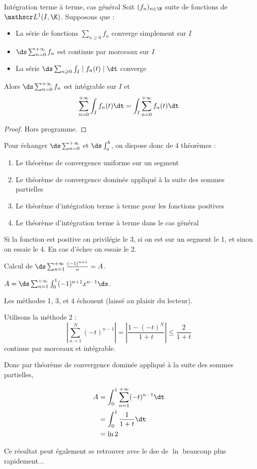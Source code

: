 \begin{theoreme}{Intégration terme à terme, cas général}{}
    Soit $(f_n)_{n \in \N}$ suite de fonctions de $\mathscr L^1(I, \K)$. Supposons que :
    \begin{itemize}
        \item La série de fonctions $\sum_{n \geqslant 0} f_n$ converge simplement sur $I$
        \item $\ds \sum_{n = 0}^{+ \infty} f_n$ est continue par morceaux sur $I$
        \item La série $\ds \sum_{n \geqslant 0 } \int_I \mid f_n(t) \mid \dt$ converge
    \end{itemize}
    Alors $\ds \sum_{n = 0 }^{+ \infty} f_n$ est intégrable sur $I$ et 
    $$\sum_{n = 0}^{+ \infty} \int_I f_n(t) \dt = \int_I \sum_{n = 0}^{+ \infty} f_n(t) \dt$$
\end{theoreme}

\begin{proof}
    Hors programme. 
\end{proof}

Pour échanger $\ds \sum_{n = 0}^{+ \infty}$ et $\ds \int_a^b$, on dispose donc de 4 théorèmes : 
\begin{enumerate}
    \item Le théorème de convergence uniforme sur un segment 
    \item Le théorème de convergence dominée appliqué à la suite des sommes partielles
    \item Le théorème d'intégration terme à terme pour les fonctions positives
    \item Le théorème d'intégration terme à terme dans le cas général
\end{enumerate}

Si la fonction est positive on privilégie le 3, si on est sur un segment le 1, et sinon 
on essaie le 4. En cas d'échec on essaie le 2. 

\begin{exemple}
    Calcul de $\ds \sum_{n = 1}^{+ \infty} \frac{(-1)^{n + 1}}{n} = A$. 

    $A = \ds \sum_{n = 1}^{+\infty} \int_{0}^{1} (-1)^{n + 1} x^{n - 1} \dx$. 

    Les méthodes 1, 3, et 4 échouent (laissé au plaisir du lecteur).

    Utilisons la méthode 2 : 
    $$ \left| \sum_{n = 1}^{N } (-t)^{n - 1} \right| = \left| \frac{1 - (-t)^N}{1 + t} \right| \leqslant \frac{2}{1 + t}$$
    continue par morceaux et intégrable. 

    Donc par théorème de convergence dominée appliqué à la suite des sommes partielles, 

    \begin{align}
        A & = \int_{0}^{1} \sum_{n = 1}^{+\infty} (-t)^{n - 1} \dt \\
        & = \int_0^1 \frac{1}{1 + t} \dt \\
        & = \ln 2
    \end{align}

    Ce résultat peut également se retrouver avec le dse de $\ln$ beaucoup plus rapidement...
\end{exemple}

